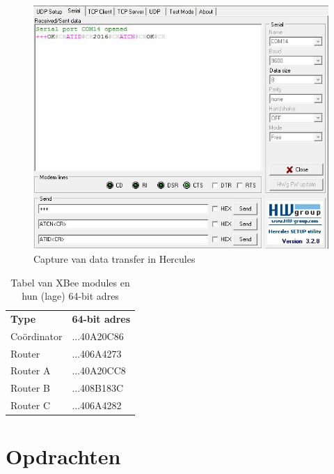 \documentclass[12pt]{article}
\begin{document}
\clearpage
\begin{center}
\begin{figure}[h]
\includegraphics[scale=.8]{Terminal_Output.jpg}
\caption{Capture van data transfer in Hercules}
\label{fig:output2}
\end{figure}
\end{center}
\begin{table}[h]
\begin{center}
\begin{tabular}{ll}
\rowcolor[HTML]{656565} 
\textbf{Type} & \textbf{64-bit adres} \\
Co\"{o}rdinator   & ...40A20C86           \\
Router        & ...406A4273           \\
Router A      & ...40A20CC8           \\
Router B      & ...408B183C           \\
Router C      & ...406A4282                      
\end{tabular}
\end{center}
\caption{Tabel van XBee modules en hun (lage) 64-bit adres}
\label{tab:info1}
\end{table}
\clearpage
\section{Opdrachten}
\end{document}

